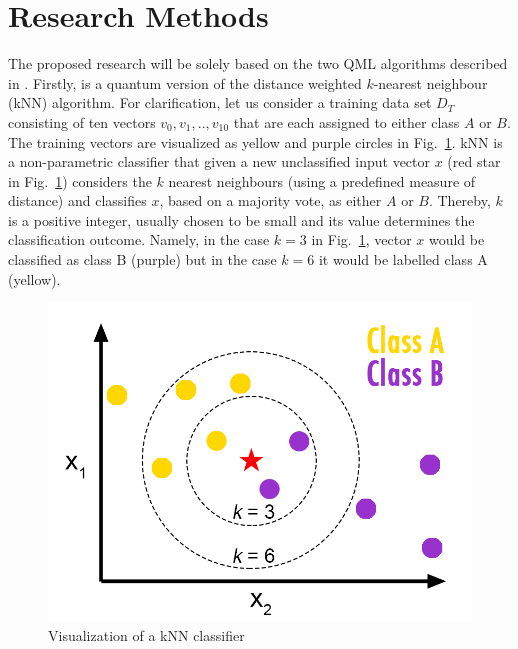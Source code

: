 \documentclass[a4paper]{article}
\newcommand*{\0}{$\ket{0}$}
\newcommand*{\1}{$\ket{1}$}
\begin{document}
\newpage
		
\section{Research Methods}
\label{sec:researchmethods}



The proposed research will be solely based on the two QML algorithms described in \cite{Schuld2014, Schuld2016}. Firstly, \cite{Schuld2014} is a quantum version of the distance weighted $k$-nearest neighbour (kNN) algorithm. For clarification, let us consider a training data set ${D}_{T}$ consisting of ten vectors ${v}_{0}, {v}_{1},..,{v}_{10}$ that are each assigned to either class $A$ or $B$. The training vectors are visualized as yellow and purple circles in Fig.~\ref{fig:knnconcept}. kNN is a non-parametric classifier that given a new unclassified input vector $x$ (red star in Fig.~\ref{fig:knnconcept}) considers the $k$ nearest neighbours (using a predefined measure of distance) and classifies $x$, based on a majority vote, as either $A$ or $B$. Thereby, $k$ is a positive integer, usually chosen to be small and its value determines the classification outcome. Namely, in the case $k = 3$ in Fig.~\ref{fig:knnconcept}, vector $x$ would be classified as class B (purple) but in the case $k = 6$ it would be labelled class A (yellow).

\begin{figure}[!ht]
      \centering
       \includegraphics[scale=0.6]{knn-concept.png}
       \caption[caption for kNN]{\label{fig:knnconcept} Visualization of a kNN classifier\footnotemark[1]}
\end{figure}
\end{document}
